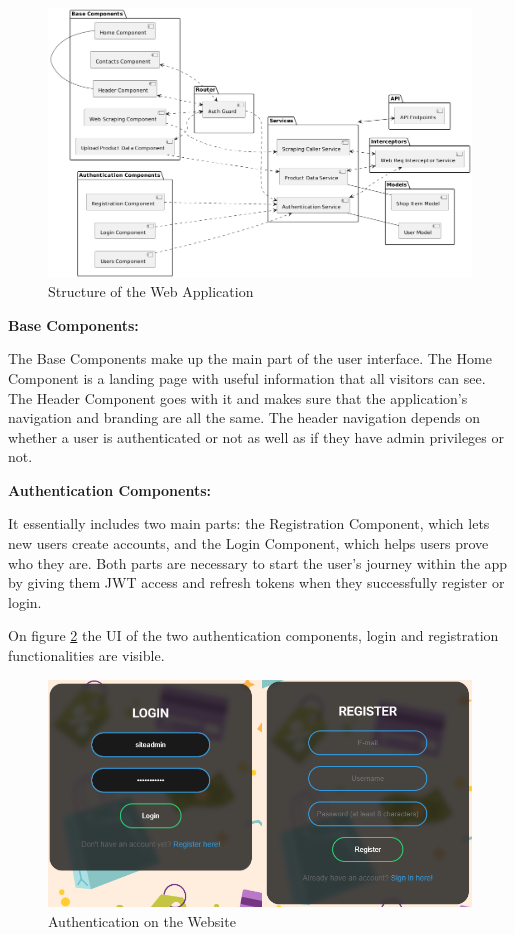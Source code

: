 \begin{figure}[H]
	\centering
	\includegraphics[width=1\linewidth]{img/website_structure.png}
	\caption{Structure of the Web Application}
	\label{fig:webappstruct}
\end{figure}

\noindent\textbf{Base Components: }

The Base Components make up the main part of the user interface. The Home Component is a landing page with useful information that all visitors can see. The Header Component goes with it and makes sure that the application's navigation and branding are all the same. The header navigation depends on whether a user is authenticated or not as well as if they have admin privileges or not. 

\noindent\textbf{Authentication Components:}

It essentially includes two main parts: the Registration Component, which lets new users create accounts, and the Login Component, which helps users prove who they are. Both parts are necessary to start the user's journey within the app by giving them JWT access and refresh tokens when they successfully register or login.

On figure \ref{fig:auth} the UI of the two authentication components, login and registration functionalities are visible. 

\begin{figure}[H]
	\centering
	\includegraphics[width=0.7\linewidth]{img/auth_web_ss.png}
	\caption{Authentication on the Website}
	\label{fig:auth}
\end{figure}

